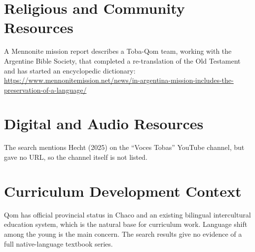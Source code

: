 \documentclass[12pt]{article}
\begin{document}
\section{Religious and Community Resources}
A Mennonite mission report describes a Toba-Qom team, working with the Argentine Bible Society, that completed a re-translation of the Old Testament and has started an encyclopedic dictionary: \url{https://www.mennonitemission.net/news/in-argentina-mission-includes-the-preservation-of-a-language/}

\section{Digital and Audio Resources}
The search mentions Hecht (2025) on the ``Voces Tobas'' YouTube channel, but gave no URL, so the channel itself is not listed.

\section{Curriculum Development Context}
Qom has official provincial status in Chaco and an existing bilingual intercultural education system, which is the natural base for curriculum work. Language shift among the young is the main concern. The search results give no evidence of a full native-language textbook series.
\end{document}
